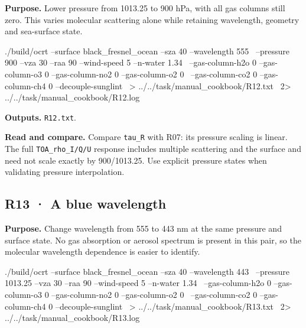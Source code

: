 \label{recipe:R12}

\textbf{Purpose. }Lower pressure from 1013.25 to 900 hPa, with all gas columns still zero. This varies molecular scattering alone while retaining wavelength, geometry and sea-surface state.

\noindent\begin{minipage}{\linewidth}
\begin{ManualCode}

./build/ocrt --surface black_fresnel_ocean --sza 40 --wavelength 555 \
  --pressure 900 --vza 30 --raa 90 --wind-speed 5 --n-water 1.34 \
  --gas-column-h2o 0 --gas-column-o3 0 --gas-column-no2 0 --gas-column-o2 0 \
  --gas-column-co2 0 --gas-column-ch4 0 --decouple-sunglint \
  > ../../task/manual_cookbook/R12.txt \
  2> ../../task/manual_cookbook/R12.log

\end{ManualCode}
\end{minipage}\par

\textbf{Outputs. }\texttt{R12.txt}.

\textbf{Read and compare. }Compare \texttt{tau\_\allowbreak{}R} with R07: its pressure scaling is linear. The full \texttt{TOA\_\allowbreak{}rho\_\allowbreak{}I/\allowbreak{}Q/\allowbreak{}U} response includes multiple scattering and the surface and need not scale exactly by 900/1013.25. Use explicit pressure states when validating pressure interpolation.


\subsection{R13 · A blue wavelength}
\label{sec:auto:09_cookbook:3.7}

\label{recipe:R13}

\textbf{Purpose. }Change wavelength from 555 to 443 nm at the same pressure and surface state. No gas absorption or aerosol spectrum is present in this pair, so the molecular wavelength dependence is easier to identify.

\noindent\begin{minipage}{\linewidth}
\begin{ManualCode}

./build/ocrt --surface black_fresnel_ocean --sza 40 --wavelength 443 \
  --pressure 1013.25 --vza 30 --raa 90 --wind-speed 5 --n-water 1.34 \
  --gas-column-h2o 0 --gas-column-o3 0 --gas-column-no2 0 --gas-column-o2 0 \
  --gas-column-co2 0 --gas-column-ch4 0 --decouple-sunglint \
  > ../../task/manual_cookbook/R13.txt \
  2> ../../task/manual_cookbook/R13.log

\end{ManualCode}
\end{minipage}\par

